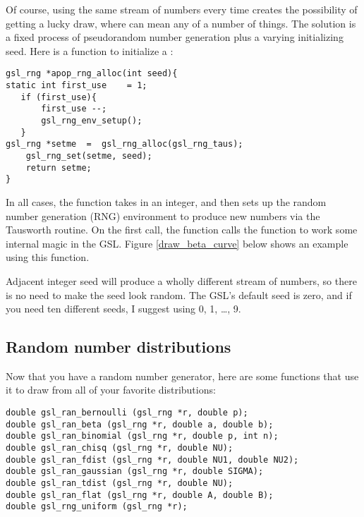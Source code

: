 Of course, using the same stream of numbers every time creates the
possibility of getting a lucky draw, where  can mean any of a
number of things. The solution is a fixed process of pseudorandom
number generation plus a varying initializing seed. Here is a function
to initialize a :
\begin{lstlisting}
gsl_rng *apop_rng_alloc(int seed){
static int first_use    = 1;
   if (first_use){
       first_use --;
       gsl_rng_env_setup();
   }
gsl_rng *setme  =  gsl_rng_alloc(gsl_rng_taus);
    gsl_rng_set(setme, seed);
    return setme;
}
\end{lstlisting}
In all cases, the function takes in an integer, and then sets up the
random number generation (RNG) environment to produce new numbers
via the Tausworth routine.  On the first call, the function calls the
 function to work some internal magic in
the GSL. Figure \ref{draw_beta_curve} below shows an example using this
function.

Adjacent integer seed will produce a wholly different stream of numbers,
so there is no need to make the seed look random. The GSL's default seed is
zero, and if you need ten different seeds, I suggest using 0, 1, \dots, 9.

\subsection{Random number distributions}
Now that you have a random number generator, here are some functions that use it to draw from all of your favorite distributions:
    
  
 

\begin{lstlisting}
double gsl_ran_bernoulli (gsl_rng *r, double p);
double gsl_ran_beta (gsl_rng *r, double a, double b);
double gsl_ran_binomial (gsl_rng *r, double p, int n);
double gsl_ran_chisq (gsl_rng *r, double NU);
double gsl_ran_fdist (gsl_rng *r, double NU1, double NU2);
double gsl_ran_gaussian (gsl_rng *r, double SIGMA);
double gsl_ran_tdist (gsl_rng *r, double NU);
double gsl_ran_flat (gsl_rng *r, double A, double B);
double gsl_rng_uniform (gsl_rng *r);
\end{lstlisting}

